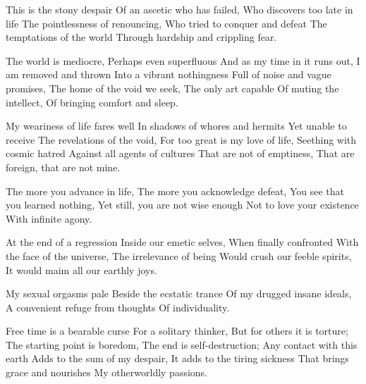 \documentclass{article}
\newenvironment{stanza}{\begin{minipage}{10cm}\obeylines}{\end{minipage}\vspace{\baselineskip}}
\begin{document}
\begin{stanza}
This is the stony despair
Of an ascetic who has failed,
Who discovers too late in life
The pointlessness of renouncing,
Who tried to conquer and defeat
The temptations of the world
Through hardship and crippling fear.
\end{stanza}

\begin{stanza}
The world is mediocre,
Perhaps even superfluous
And as my time in it runs out,
I am removed and thrown
Into a vibrant nothingness
Full of noise and vague promises,
The home of the void we seek,
The only art capable
Of muting the intellect,
Of bringing comfort and sleep.
\end{stanza}

\begin{stanza}
My weariness of life fares well
In shadows of whores and hermits
Yet unable to receive
The revelations of the void,
For too great is my love of life,
Seething with cosmic hatred
Against all agents of cultures
That are not of emptiness,
That are foreign, that are not mine.
\end{stanza}

\begin{stanza}
The more you advance in life,
The more you acknowledge defeat,
You see that you learned nothing,
Yet still, you are not wise enough
Not to love your existence
With infinite agony.
\end{stanza}

\begin{stanza}
At the end of a regression
Inside our emetic selves,
When finally confronted
With the face of the universe,
The irrelevance of being
Would crush our feeble spirits,
It would maim all our earthly joys.
\end{stanza}

\begin{stanza}
My sexual orgasms pale
Beside the ecstatic trance
Of my drugged insane ideals,
A convenient refuge from thoughts
Of individuality.
\end{stanza}

\begin{stanza}
Free time is a bearable curse
For a solitary thinker,
But for others it is torture;
The starting point is boredom,
The end is self-destruction;
Any contact with this earth
Adds to the sum of my despair,
It adds to the tiring sickness
That brings grace and nourishes
My otherworldly passions.
\end{stanza}
\end{document}
